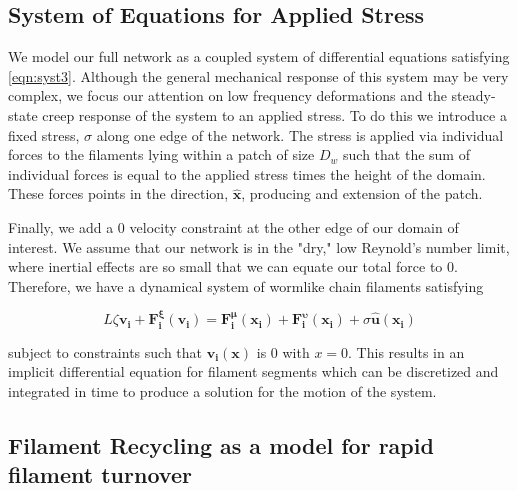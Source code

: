 \documentclass[10pt,letterpaper]{article}
\begin{document}
\subsection*{System of Equations for Applied Stress}
We model our full network as a coupled system of differential equations satisfying \ref{eqn:syst3}.  Although the general mechanical response of this system may be very complex, we focus our attention on low frequency deformations and the steady-state creep response of the system to an applied stress.  To do this we introduce a fixed stress, $\sigma$ along one edge of the network.  The stress is applied via individual forces to the filaments lying within a patch of size $D_w$ such that the sum of individual forces is equal to the applied stress times the height of the domain.  These forces points in the direction, $\mathbf{\hat{x}}$, producing and extension of the patch.

Finally, we add a 0 velocity constraint at the other edge of our domain of interest.  We assume that our network is in the "dry," low Reynold's number limit, where inertial effects are so small that we can equate our total force to 0.  Therefore, we have a dynamical system of wormlike chain filaments satisfying

\begin{equation}
\label{eqn:systfull}
L\zeta\mathbf{ v_i} +\mathbf{F^{\xi}_i(v_i)}= \mathbf{F^{\mu}_i(x_i)}+\mathbf{F^{\upsilon}_i(x_i)} + \sigma\mathbf{\hat{u}(x_i)}
\end{equation}

subject to constraints such that $\mathbf{v_i(x)}$ is 0 with $x=0$.  This results in an implicit differential equation for filament segments which can be discretized and integrated in time to produce a solution for the motion of the system.


\subsection*{Filament Recycling as a model for rapid filament turnover}
\end{document}

